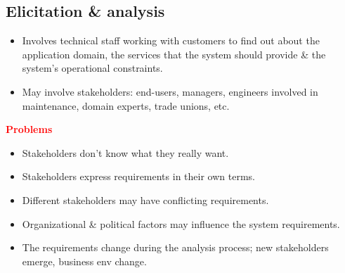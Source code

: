 \documentclass{report}
\newcommand{\textr}[1]{\textcolor{red}{#1}}
\newcommand{\textbfr}[1]{\textbf{\textr{#1}}}
\begin{document}
\vspace{-2em}
\subsection{Elicitation \& analysis}
\begin{itemize}
  \item Involves technical staff working with customers to find out about the application domain, the
services that the system should provide \& the system's operational constraints.
  \item May involve stakeholders: end-users, managers, engineers involved in maintenance, domain experts, trade unions, etc.
\end{itemize}
\textbfr{Problems}
\begin{itemize}
  \item Stakeholders don't know what they really want.
  \item Stakeholders express requirements in their own terms.
  \item Different stakeholders may have conflicting requirements.
  \item Organizational \& political factors may influence the system requirements.
  \item The requirements change during the analysis process; new stakeholders emerge, business env change.
\end{itemize}
\end{document}
